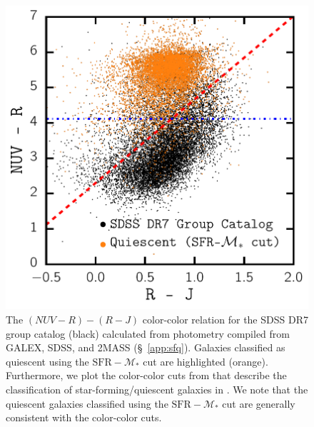 \documentclass[iop,apj,tighten,twocolappendix,numberedappendix]{emulateapj}
\begin{document}
\begin{figure}
\begin{center}
\includegraphics[scale=0.5]{figs/nuv_r_j.pdf}
\caption{
The $(NUV - R) - (R - J)$ color-color relation for the
SDSS DR7 group catalog (black) calculated from photometry 
compiled from GALEX, SDSS, and 2MASS (\S~\ref{app:sfq}). 
Galaxies classified as quiescent using the $\mathrm{SFR} - \mathcal{M}_*$ 
cut are highlighted (orange). Furthermore, we plot the color-color 
cuts from \cite{Bundy:2010aa} that describe the classification
of star-forming/quiescent galaxies in \cite{Tinker:2013aa}. 
We note that the quiescent galaxies classified using the 
$\mathrm{SFR} - \mathcal{M}_*$ cut are generally consistent with 
the \cite{Bundy:2010aa} color-color cuts. 
}
\label{fig:NUV_R_J}
\end{center}
\end{figure}
\end{document}
